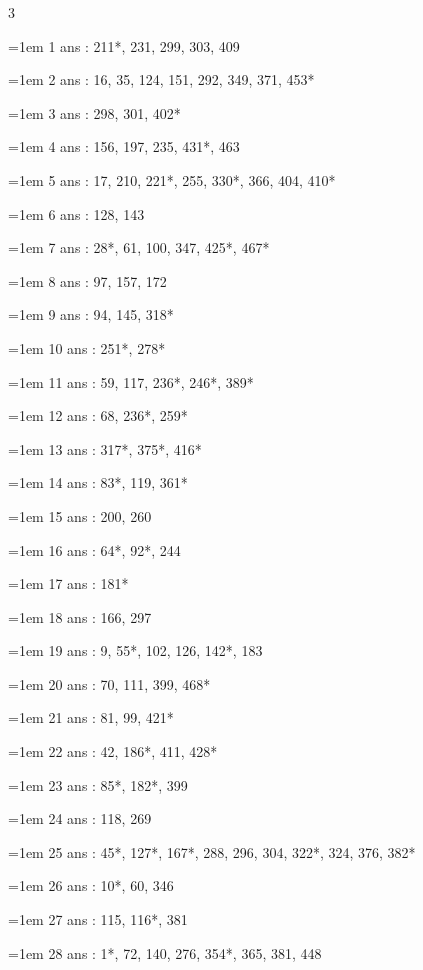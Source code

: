 \begin{multicols}{3}\footnotesize\setlength{\parindent}{0pt}\raggedright
\hangindent=1em 1 ans : 211*, 231, 299, 303, 409\par
\hangindent=1em 2 ans : 16, 35, 124, 151, 292, 349, 371, 453*\par
\hangindent=1em 3 ans : 298, 301, 402*\par
\hangindent=1em 4 ans : 156, 197, 235, 431*, 463\par
\hangindent=1em 5 ans : 17, 210, 221*, 255, 330*, 366, 404, 410*\par
\hangindent=1em 6 ans : 128, 143\par
\hangindent=1em 7 ans : 28*, 61, 100, 347, 425*, 467*\par
\hangindent=1em 8 ans : 97, 157, 172\par
\hangindent=1em 9 ans : 94, 145, 318*\par
\hangindent=1em 10 ans : 251*, 278*\par
\hangindent=1em 11 ans : 59, 117, 236*, 246*, 389*\par
\hangindent=1em 12 ans : 68, 236*, 259*\par
\hangindent=1em 13 ans : 317*, 375*, 416*\par
\hangindent=1em 14 ans : 83*, 119, 361*\par
\hangindent=1em 15 ans : 200, 260\par
\hangindent=1em 16 ans : 64*, 92*, 244\par
\hangindent=1em 17 ans : 181*\par
\hangindent=1em 18 ans : 166, 297\par
\hangindent=1em 19 ans : 9, 55*, 102, 126, 142*, 183\par
\hangindent=1em 20 ans : 70, 111, 399, 468*\par
\hangindent=1em 21 ans : 81, 99, 421*\par
\hangindent=1em 22 ans : 42, 186*, 411, 428*\par
\hangindent=1em 23 ans : 85*, 182*, 399\par
\hangindent=1em 24 ans : 118, 269\par
\hangindent=1em 25 ans : 45*, 127*, 167*, 288, 296, 304, 322*, 324, 376, 382*\par
\hangindent=1em 26 ans : 10*, 60, 346\par
\hangindent=1em 27 ans : 115, 116*, 381\par
\hangindent=1em 28 ans : 1*, 72, 140, 276, 354*, 365, 381, 448\par

\end{multicols}
